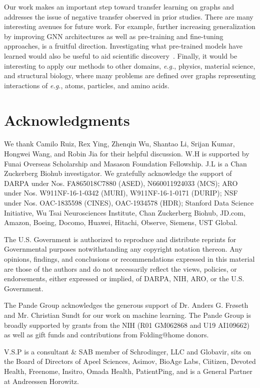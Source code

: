 \documentclass{article} \usepackage{iclr2020_conference,times}
\numberwithin{equation}{section}
\theoremstyle{plain}
\theoremstyle{definition}
\theoremstyle{remark}
\newcommand{\eg}{\textit{e.g.}}
\begin{document}
Our work makes an important step toward transfer learning on graphs and addresses the issue of negative transfer observed in prior studies.
There are many interesting avenues for future work. For example, further increasing generalization by improving GNN architectures as well as pre-training and fine-tuning approaches, is a fruitful direction. 
Investigating what pre-trained models have learned would also be useful to aid scientific discovery~\citep{tshitoyan2019unsupervised}.
Finally, it would be interesting to apply our methods to other domains, \eg, physics, material science, and structural biology, where many problems are defined over graphs representing interactions of \eg, atoms, particles, and amino acids.
 
\section*{Acknowledgments}
We thank Camilo Ruiz, Rex Ying, Zhenqin Wu, Shantao Li, Srijan Kumar, Hongwei Wang, and Robin Jia for their helpful discussion.
W.H is supported by Funai Overseas Scholarship and Masason Foundation Fellowship.
J.L is a Chan Zuckerberg Biohub investigator.
We gratefully acknowledge the support of
DARPA under Nos. FA865018C7880 (ASED), N660011924033 (MCS);
ARO under Nos. W911NF-16-1-0342 (MURI), W911NF-16-1-0171 (DURIP);
NSF under Nos. OAC-1835598 (CINES), OAC-1934578 (HDR);
Stanford Data Science Initiative, 
Wu Tsai Neurosciences Institute,
Chan Zuckerberg Biohub,
JD.com, Amazon, Boeing, Docomo, Huawei, Hitachi, Observe, Siemens, UST Global. 

The U.S. Government is authorized to reproduce and distribute reprints for Governmental purposes notwithstanding any copyright notation thereon. Any opinions, findings, and conclusions or recommendations expressed in this material are those of the authors and do not necessarily reflect the views, policies, or endorsements, either expressed or implied, of DARPA, NIH, ARO, or the U.S. Government.

The Pande Group acknowledges the generous support of Dr.  Anders G. Fr\o seth and Mr.  Christian Sundt for our work on machine learning.  The Pande Group is broadly supported by grants from the NIH (R01 GM062868 and U19 AI109662) as well as gift funds and contributions from Folding@home donors.

V.S.P is a consultant \& SAB member of Schrodinger, LLC and Globavir, sits on the Board of Directors of Apeel Sciences, Asimov, BioAge Labs, Ciitizen, Devoted Health, Freenome, Insitro, Omada Health, PatientPing, and is a General Partner at Andreessen Horowitz.
\end{document}
